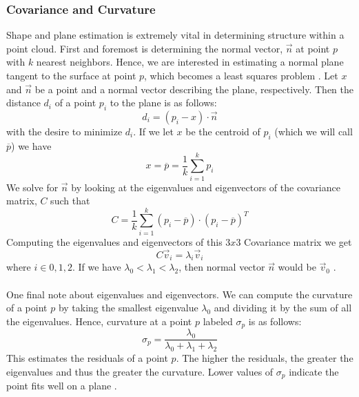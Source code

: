 \documentclass[11pt]{article}
\theoremstyle{definition}
\begin{document}
\subsubsection{Covariance and Curvature}\label{subsub:cov}
Shape and plane estimation is extremely vital in determining structure within a point cloud.   First and foremost is determining the normal vector, $\vec{n}$ at point $p$ with $k$ nearest neighbors.  Hence, we are interested in estimating a normal plane tangent to the surface at point $p$, which becomes a least squares problem \cite{RusuDoctoralDissertation}.  Let $x$ and $\vec{n}$ be a point and a normal vector describing the plane, respectively.  Then the distance $d_i$ of a point $p_i$ to the plane is as follows:
\begin{equation}\label{eqn:least_square}
d_i = (p_i - x)\cdot{\vec{n}}
\end{equation}
with the desire to minimize $d_i$.   If we let $x$ be the centroid of $p_i$ (which we will call $\overline{p}$) we have
\begin{equation}\label{eqn:centroid}
x = \overline{p} = \frac{1}{k}\sum_{i=1}^{k}p_i
\end{equation}
We solve for $\vec{n}$ by looking at the eigenvalues and eigenvectors of the covariance matrix, $C$ such that
\begin{equation}\label{eqn:cov}
C = \frac{1}{k}\sum_{i=1}^{k}(p_i - \overline{p})\cdot(p_i - \overline{p})^T
\end{equation}
Computing the eigenvalues and eigenvectors of this $3x3$ Covariance matrix we get 
\begin{equation}\label{eqn:eigen}
C\vec{v}_i = \lambda_i\vec{v}_i 
\end{equation}
where $i \in {0,1,2}$.  If we have $\lambda_0 < \lambda_1 < \lambda_2$, then normal vector $\vec{n}$ would be $\vec{v}_0$ \cite{RusuDoctoralDissertation}.  
\\\\
One final note about eigenvalues and eigenvectors.  We can compute the curvature of a point $p$ by taking the smallest eigenvalue $\lambda_0$ and dividing it by the sum of all the eigenvalues.  Hence, curvature at a point $p$ labeled $\sigma_p$ is as follows:
\begin{equation}\label{eqn:curvature}
\sigma_p = \frac{\lambda_0}{\lambda_0 + \lambda_1 + \lambda_2}
\end{equation}
This estimates the residuals of a point $p$.  The higher the residuals, the greater the eigenvalues and thus the greater the curvature.  Lower values of $\sigma_p$ indicate the point fits well on a plane \cite{RusuDoctoralDissertation}.  
	\newpage


	
	
\end{document}
